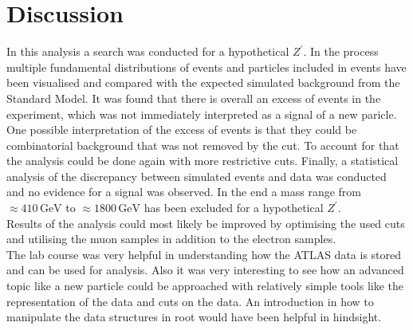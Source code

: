 \section{Discussion}
\label{sec:Diskussion}
In this analysis a search was conducted for a hypothetical $Z^\prime$. In the process multiple fundamental distributions of events and particles included
in events have been visualised and compared with the expected simulated background from the Standard Model. It was found that there is overall an excess
of events in the experiment, which was not immediately interpreted as a signal of a new paricle. One possible interpretation of the excess of events is
that they could be combinatorial background that was not removed by the cut. To account for that the analysis could be done again with more restrictive cuts.
Finally, a statistical analysis of the discrepancy between simulated events and data was conducted and no evidence for a signal was observed. In the end a mass
range from $\approx 410 \, \si{\giga\eV}$ to $\approx 1800 \, \si{\giga\eV}$ has been excluded for a hypothetical $Z^\prime$.\\
Results of the analysis could most likely be improved by optimising the used cuts and utilising the muon samples in addition to the electron samples. \\
The lab course was very helpful in understanding how the ATLAS data is stored and can be used for analysis. Also it was very interesting to see how
an advanced topic like a new particle could be approached with relatively simple tools like the representation of the data and cuts on the data. An introduction 
in how to manipulate the data structures in root would have been helpful in hindsight.
